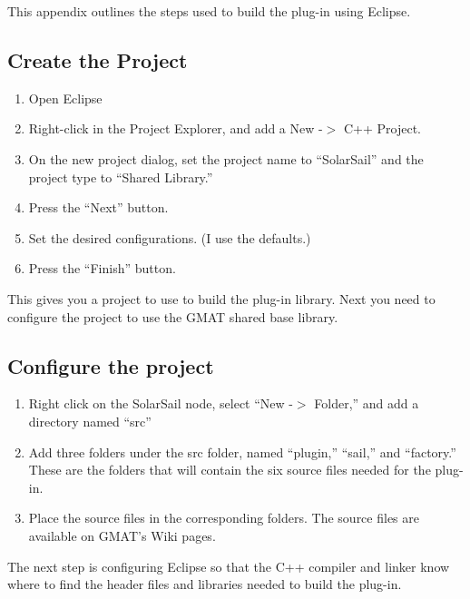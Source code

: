 \documentclass[letterpaper,10pt]{article}
\begin{document}
This appendix outlines the steps used to build the plug-in using Eclipse.

\subsection{Create the Project}

\begin{enumerate}
\item Open Eclipse
\item Right-click in the Project Explorer, and add a New -$>$ C++ Project.
\item On the new project dialog, set the project name to ``SolarSail'' and the project type to
``Shared Library.''
\item Press the ``Next'' button.
\item Set the desired configurations.  (I use the defaults.)
\item Press the ``Finish'' button.
\end{enumerate}

This gives you a project to use to build the plug-in library.  Next you need to configure the
project to use the GMAT shared base library.

\subsection{Configure the project}

\begin{enumerate}
\item Right click on the SolarSail node, select ``New -$>$ Folder,'' and add a directory named
``src''
\item Add three folders under the src folder, named ``plugin,'' ``sail,'' and ``factory.''  These
are the folders that will contain the six source files needed for the plug-in.
\item Place the source files in the corresponding folders.  The source files are available on
GMAT's Wiki pages.
\end{enumerate}

The next step is configuring Eclipse so that the C++ compiler and linker know where to find the
header files and libraries needed to build the plug-in.
\end{document}

